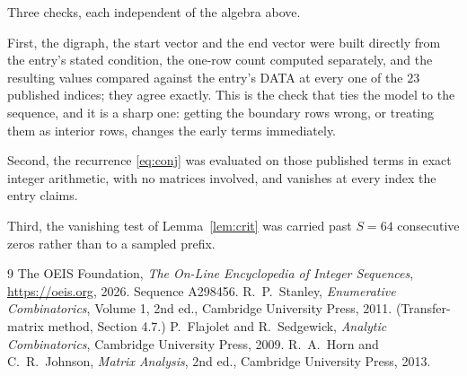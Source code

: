 \documentclass[11pt,a4paper]{article}
\theoremstyle{plain}
\theoremstyle{definition}
\begin{document}
Three checks, each independent of the algebra above.

First, the digraph, the start vector and the end vector were built directly from the
entry's stated condition, the one-row count computed separately, and the resulting values
compared against the entry's DATA at every one of the $23$ published indices; they
agree exactly. This is the check that ties the model to the sequence, and it is a sharp one:
getting the boundary rows wrong, or treating them as interior rows, changes the early terms
immediately.

Second, the recurrence \eqref{eq:conj} was evaluated on those published terms in exact
integer arithmetic, with no matrices involved, and vanishes at every index the entry claims.

Third, the vanishing test of Lemma~\ref{lem:crit} was carried past $S=64$ consecutive
zeros rather than to a sampled prefix.

\begin{thebibliography}{9}
 The OEIS Foundation, \emph{The On-Line Encyclopedia of Integer
Sequences}, \url{https://oeis.org}, 2026. Sequence A298456.
 R.~P.~Stanley, \emph{Enumerative Combinatorics}, Volume 1, 2nd ed.,
Cambridge University Press, 2011. (Transfer-matrix method, Section 4.7.)
 P.~Flajolet and R.~Sedgewick, \emph{Analytic Combinatorics}, Cambridge
University Press, 2009.
 R.~A.~Horn and C.~R.~Johnson, \emph{Matrix Analysis}, 2nd ed., Cambridge
University Press, 2013.
\end{thebibliography}
\end{document}
